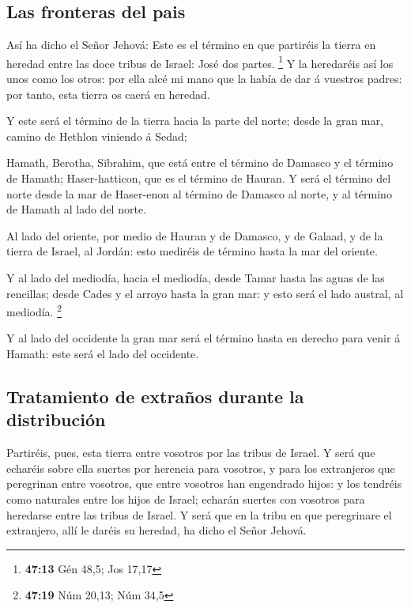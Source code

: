 \hypertarget{las-fronteras-del-pais}{%
\subsection{Las fronteras del pais}\label{las-fronteras-del-pais}}

 Así ha dicho el Señor Jehová: Este es el término en que
partiréis la tierra en heredad entre las doce tribus de Israel: José dos
partes. \footnote{\textbf{47:13} Gén 48,5; Jos 17,17}  Y la
heredaréis así los unos como los otros: por ella alcé mi mano que la
había de dar á vuestros padres: por tanto, esta tierra os caerá en
heredad.

 Y este será el término de la tierra hacia la parte del
norte; desde la gran mar, camino de Hethlon viniendo á Sedad;

 Hamath, Berotha, Sibrahim, que está entre el término de
Damasco y el término de Hamath; Haser-hatticon, que es el término de
Hauran.  Y será el término del norte desde la mar de
Haser-enon al término de Damasco al norte, y al término de Hamath al
lado del norte.

 Al lado del oriente, por medio de Hauran y de Damasco, y
de Galaad, y de la tierra de Israel, al Jordán: esto mediréis de término
hasta la mar del oriente.

 Y al lado del mediodía, hacia el mediodía, desde Tamar
hasta las aguas de las rencillas; desde Cades y el arroyo hasta la gran
mar: y esto será el lado austral, al mediodía. \footnote{\textbf{47:19}
  Núm 20,13; Núm 34,5}

 Y al lado del occidente la gran mar será el término hasta
en derecho para venir á Hamath: este será el lado del occidente.

\hypertarget{tratamiento-de-extrauxf1os-durante-la-distribuciuxf3n}{%
\subsection{Tratamiento de extraños durante la
distribución}\label{tratamiento-de-extrauxf1os-durante-la-distribuciuxf3n}}

 Partiréis, pues, esta tierra entre vosotros por las tribus
de Israel.  Y será que echaréis sobre ella suertes por
herencia para vosotros, y para los extranjeros que peregrinan entre
vosotros, que entre vosotros han engendrado hijos: y los tendréis como
naturales entre los hijos de Israel; echarán suertes con vosotros para
heredarse entre las tribus de Israel.  Y será que en la
tribu en que peregrinare el extranjero, allí le daréis su heredad, ha
dicho el Señor Jehová.

